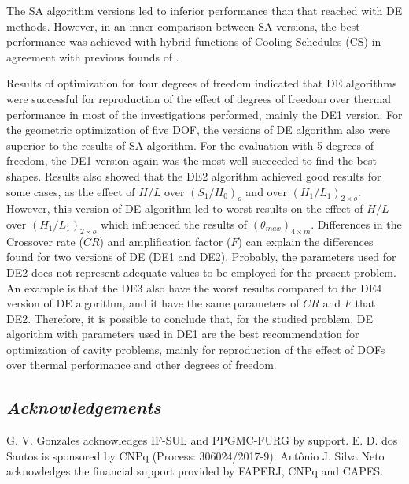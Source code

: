 \documentclass[12pt,fleqn]{article}
\begin{document}
The SA algorithm versions led to inferior performance than that reached with DE methods. However, in an inner comparison between SA versions, the best performance was achieved with hybrid functions of Cooling Schedules (CS) in agreement with previous founds of \cite{Gonzales2015a,Gonzales2015b}.

Results of optimization for four degrees of freedom indicated that DE algorithms were successful for reproduction of the effect of degrees of freedom over thermal performance in most of the investigations performed, mainly the DE1 version. For the geometric optimization of five DOF, the versions of DE algorithm also were superior to the results of SA algorithm. For the evaluation with 5 degrees of freedom, the DE1 version again was the most well succeeded to find the best shapes. Results also showed that the DE2 algorithm achieved good results for some cases, as the effect of $H/L$ over ${(S_{1}/H_{0})_{o}}$ and over ${(H_{1}/L_{1})_{2  \times o}}$. However, this version of DE algorithm led to worst results on the effect of $H/L$ over ${(H_{1}/L_{1})_{2  \times o}}$ which influenced the results of $({\theta}_{max})_{4\times m}$. Differences in the Crossover rate ($CR$) and amplification factor ($F$) can explain the differences found for two versions of DE (DE1 and DE2). Probably, the parameters used for DE2 does not represent adequate values to be employed for the present problem. An example is that the DE3 also have the worst results compared to the DE4 version of DE algorithm, and it have the same parameters of $CR$ and $F$ that DE2. Therefore, it is possible to conclude that, for the studied problem, DE algorithm with parameters used in DE1 are the best recommendation for optimization of cavity problems, mainly for reproduction of the effect of DOFs over thermal performance and other degrees of freedom.




\subsection*{\textit{Acknowledgements}}
G. V. Gonzales acknowledges IF-SUL and PPGMC-FURG by support. E. D. dos Santos is sponsored by CNPq (Process: 306024/2017-9). Antônio J. Silva Neto acknowledges the financial support provided by FAPERJ, CNPq and CAPES.



\fontsize{11}{0}\selectfont







\end{document}
